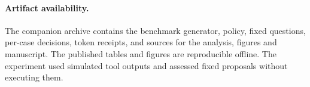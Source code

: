 \documentclass[10pt,letterpaper]{article}
\begin{document}
\paragraph{Artifact availability.}
The companion archive contains the benchmark generator, policy, fixed questions, per-case decisions, token receipts, and sources for the analysis, figures and manuscript. The published tables and figures are reproducible offline. The experiment used simulated tool outputs and assessed fixed proposals without executing them.

\FloatBarrier
\appendix

\FloatBarrier


\end{document}
